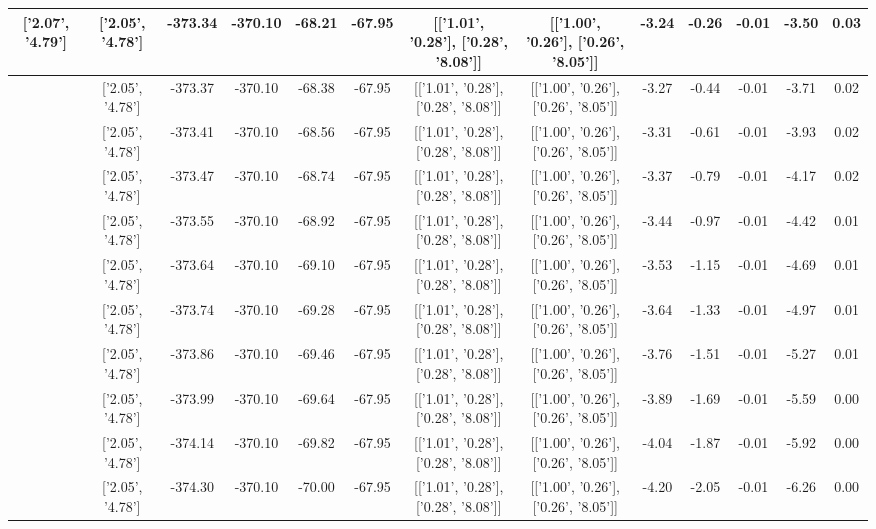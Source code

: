 \begin{table}[htbp]
\begin{adjustbox}{angle=90}
\begin{tabular}{|c|c|c|c|c|c|c|c|c|c|c|c|c|}
 ['2.07', '4.79'] & ['2.05', '4.78'] & -373.34 & -370.10 & -68.21 & -67.95 & [['1.01', '0.28'], ['0.28', '8.08']] & [['1.00', '0.26'], ['0.26', '8.05']] & -3.24 & -0.26 & -0.01 & -3.50 & 0.03\\ \hline
 ['2.08', '4.79'] & ['2.05', '4.78'] & -373.37 & -370.10 & -68.38 & -67.95 & [['1.01', '0.28'], ['0.28', '8.08']] & [['1.00', '0.26'], ['0.26', '8.05']] & -3.27 & -0.44 & -0.01 & -3.71 & 0.02\\ \hline
 ['2.09', '4.79'] & ['2.05', '4.78'] & -373.41 & -370.10 & -68.56 & -67.95 & [['1.01', '0.28'], ['0.28', '8.08']] & [['1.00', '0.26'], ['0.26', '8.05']] & -3.31 & -0.61 & -0.01 & -3.93 & 0.02\\ \hline
 ['2.10', '4.79'] & ['2.05', '4.78'] & -373.47 & -370.10 & -68.74 & -67.95 & [['1.01', '0.28'], ['0.28', '8.08']] & [['1.00', '0.26'], ['0.26', '8.05']] & -3.37 & -0.79 & -0.01 & -4.17 & 0.02\\ \hline
 ['2.11', '4.80'] & ['2.05', '4.78'] & -373.55 & -370.10 & -68.92 & -67.95 & [['1.01', '0.28'], ['0.28', '8.08']] & [['1.00', '0.26'], ['0.26', '8.05']] & -3.44 & -0.97 & -0.01 & -4.42 & 0.01\\ \hline
 ['2.13', '4.80'] & ['2.05', '4.78'] & -373.64 & -370.10 & -69.10 & -67.95 & [['1.01', '0.28'], ['0.28', '8.08']] & [['1.00', '0.26'], ['0.26', '8.05']] & -3.53 & -1.15 & -0.01 & -4.69 & 0.01\\ \hline
 ['2.14', '4.80'] & ['2.05', '4.78'] & -373.74 & -370.10 & -69.28 & -67.95 & [['1.01', '0.28'], ['0.28', '8.08']] & [['1.00', '0.26'], ['0.26', '8.05']] & -3.64 & -1.33 & -0.01 & -4.97 & 0.01\\ \hline
 ['2.15', '4.80'] & ['2.05', '4.78'] & -373.86 & -370.10 & -69.46 & -67.95 & [['1.01', '0.28'], ['0.28', '8.08']] & [['1.00', '0.26'], ['0.26', '8.05']] & -3.76 & -1.51 & -0.01 & -5.27 & 0.01\\ \hline
 ['2.16', '4.81'] & ['2.05', '4.78'] & -373.99 & -370.10 & -69.64 & -67.95 & [['1.01', '0.28'], ['0.28', '8.08']] & [['1.00', '0.26'], ['0.26', '8.05']] & -3.89 & -1.69 & -0.01 & -5.59 & 0.00\\ \hline
 ['2.17', '4.81'] & ['2.05', '4.78'] & -374.14 & -370.10 & -69.82 & -67.95 & [['1.01', '0.28'], ['0.28', '8.08']] & [['1.00', '0.26'], ['0.26', '8.05']] & -4.04 & -1.87 & -0.01 & -5.92 & 0.00\\ \hline
 ['2.18', '4.81'] & ['2.05', '4.78'] & -374.30 & -370.10 & -70.00 & -67.95 & [['1.01', '0.28'], ['0.28', '8.08']] & [['1.00', '0.26'], ['0.26', '8.05']] & -4.20 & -2.05 & -0.01 & -6.26 & 0.00\\ \hline

\end{tabular}
\end{adjustbox}
\end{table}
